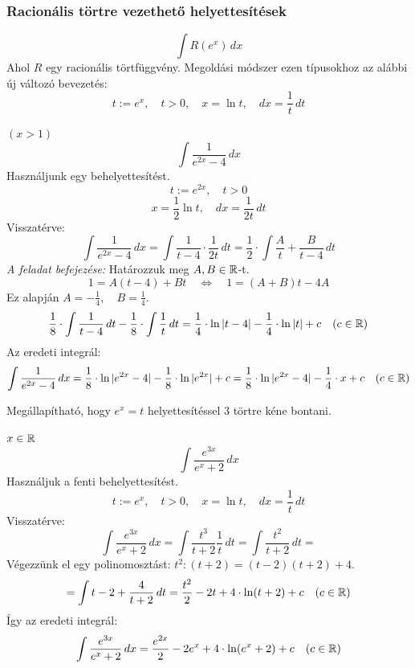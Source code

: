 \documentclass[a4paper,11.5pt]{article}
\begin{document}
	\subsubsection{Racionális törtre vezethető helyettesítések}
	\begin{example}
		\[ \int R(e^x)\,dx \]
		Ahol $R$ egy racionális törtfüggvény.
		Megoldási módszer ezen típusokhoz az alábbi új változó bevezetés:
		\[ t:=e^x,\quad t>0,\quad x=\ln t,\quad dx=\frac{1}{t}\,dt \]
	\end{example}
	\begin{exercise}$(x>1)$
		\[ \int\frac{1}{e^{2x}-4}\,dx \]
		Használjunk egy behelyettesítést.
		\[ t:=e^{2x},\quad t>0 \]
		\[ x=\frac{1}{2}\ln t,\quad dx=\frac{1}{2t}\,dt \]
		Visszatérve:
		\[ \int\frac{1}{e^{2x}-4}\,dx=\int\frac{1}{t-4}\cdot\frac{1}{2t}\,dt=\frac{1}{2}\cdot\int\frac{A}{t}+\frac{B}{t-4}\,dt \]
		\textit{A feladat befejezése:} Határozzuk meg $A,B\in\mathbb{R}$-t.
		\[ 1=A(t-4)+Bt\quad \Leftrightarrow\quad 1=(A+B)t-4A \]
		Ez alapján $A=-\frac{1}{4},\quad B=\frac{1}{4}$.
		\[ \frac{1}{8}\cdot\int\frac{1}{t-4}\,dt-\frac{1}{8}\cdot\int\frac{1}{t}\,dt=\frac{1}{4}\cdot\ln|t-4|-\frac{1}{4}\cdot\ln|t|+c\quad (c\in\mathbb{R}) \]
		Az eredeti integrál:
		\[ \int\frac{1}{e^{2x}-4}\,dx=\frac{1}{8}\cdot\ln|e^{2x}-4|-\frac{1}{8}\cdot\ln|e^{2x}|+c=\frac{1}{8}\cdot\ln|e^{2x}-4|-\frac{1}{4}\cdot x+c\quad (c\in\mathbb{R}) \]
	\end{exercise}
	\begin{note}
		Megállapítható, hogy $e^x=t$ helyettesítéssel 3 törtre kéne bontani.
	\end{note}
	\begin{task}$x\in\mathbb{R}$
		\[ \int\frac{e^{3x}}{e^x+2}\,dx \]
		Használjuk a fenti behelyettesítést.
		\[ t:=e^x,\quad t>0,\quad x=\ln t,\quad dx=\frac{1}{t}\,dt \]
		Visszatérve:
		\[ \int\frac{e^{3x}}{e^x+2}\,dx=\int\frac{t^3}{t+2}\frac{1}{t}\,dt=\int\frac{t^2}{t+2}\,dt= \]
		Végezzünk el egy polinomosztást: \quad $t^2 : (t+2)=(t-2)(t+2)+4$.
		\[ =\int t-2+\frac{4}{t+2}\,dt=\frac{t^2}{2}-2t+4\cdot\ln(t+2)+c\quad (c\in\mathbb{R}) \]
		Így az eredeti integrál:
		\[ \int\frac{e^{3x}}{e^x+2}\,dx=\frac{e^{2x}}{2}-2e^x+4\cdot\ln(e^x+2)+c\quad (c\in\mathbb{R}) \]
	\end{task}
\end{document}
